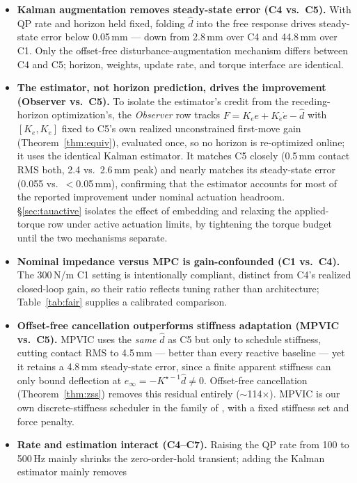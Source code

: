 \documentclass[journal]{IEEEtran}
\begin{document}
\begin{itemize}[leftmargin=*,itemsep=1pt,topsep=2pt]
\item \textbf{Kalman augmentation removes steady-state error (C4 vs.\
C5).} With QP rate and horizon held fixed, folding $\hat d$ into the
free response drives steady-state error below 0.05\,mm --- down from
2.8\,mm over C4 and 44.8\,mm over C1. Only the offset-free
disturbance-augmentation mechanism differs between C4 and C5; horizon,
weights, update rate, and torque interface are identical.
\item \textbf{The estimator, not horizon prediction, drives the
improvement (Observer vs.\ C5).} To isolate the estimator's credit from
the receding-horizon optimization's, the \emph{Observer} row tracks
$F=K_ee+K_{\dot e}\dot e-\hat d$ with $[K_e,K_{\dot e}]$ fixed to C5's own
realized unconstrained first-move gain (Theorem~\ref{thm:equiv}), evaluated
once, so no horizon is re-optimized online; it uses the identical Kalman
estimator. It matches C5 closely (0.5\,mm contact RMS both, 2.4 vs.\
2.6\,mm peak) and nearly matches its steady-state error (0.055 vs.\
$<$0.05\,mm), confirming that the estimator accounts for most of the
reported improvement under nominal actuation headroom.
\S\ref{sec:tauactive} isolates the effect of embedding and relaxing the
applied-torque row under active actuation limits, by tightening the
torque budget until the two mechanisms separate.
\item \textbf{Nominal impedance versus MPC is gain-confounded (C1 vs.\ C4).}
The 300\,N/m C1 setting is intentionally compliant, distinct from C4's
realized closed-loop gain, so their ratio reflects tuning rather than
architecture; Table~\ref{tab:fair} supplies a calibrated comparison.
\item \textbf{Offset-free cancellation outperforms stiffness adaptation (MPVIC vs.\ C5).}
MPVIC uses the \emph{same} $\hat d$ as C5 but only to schedule
stiffness, cutting contact RMS to 4.5\,mm --- better than every
reactive baseline --- yet it retains a 4.8\,mm steady-state error,
since a finite apparent stiffness can only bound deflection at
$e_\infty=-K^{\star-1}\hat d\neq0$. Offset-free cancellation
(Theorem~\ref{thm:zss}) removes this residual entirely ($\sim$114$\times$).
MPVIC is our own discrete-stiffness scheduler in the family of
\cite{liu2025model,roveda2019optimal}, with a fixed stiffness set and
force penalty.
\item \textbf{Rate and estimation interact (C4--C7).}
Raising the QP rate from 100 to 500\,Hz mainly shrinks the
zero-order-hold transient; adding the Kalman estimator mainly removes

\end{itemize}
\end{document}
